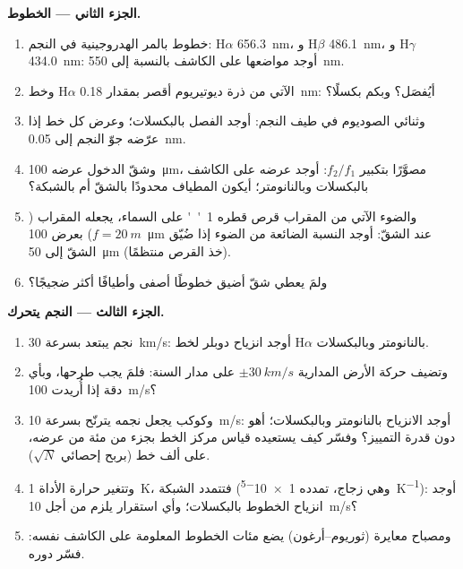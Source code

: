 \begin{problem}
\medskip
\noindent\textbf{الجزء الثاني --- الخطوط.}
\begin{enumerate}[resume]
  \item خطوط بالمر الهدروجينية في النجم: H$\alpha$ \qty{656.3}{nm}،
        و H$\beta$ \qty{486.1}{nm}، و H$\gamma$ \qty{434.0}{nm}: أوجد مواضعها على
        الكاشف بالنسبة إلى \qty{550}{nm}.
  \item وخط H$\alpha$ الآتي من ذرة ديوتيريوم أقصر بمقدار \qty{0.18}{nm}: أيُفصَل؟
        وبكم بكسلًا؟
  \item وثنائي الصوديوم في طيف النجم: أوجد الفصل
        بالبكسلات؛ وعرض كل خط إذا عرّضه جوّ النجم
        إلى \qty{0.05}{nm}.
  \item وشقّ الدخول عرضه \qty{100}{\micro m}، مصوَّرًا بتكبير
        $f_2/f_1$: أوجد عرضه على الكاشف بالبكسلات
        وبالنانومتر؛ أيكون المطياف محدودًا بالشقّ أم بالشبكة؟
  \item والضوء الآتي من المقراب قرص قطره \qty{1}{''} على
        السماء، يجعله المقراب ($f = \qty{20}{m}$) بعرض \qty{100}{\micro m}
        عند الشقّ: أوجد النسبة الضائعة من الضوء إذا ضُيّق الشقّ
        إلى \qty{50}{\micro m} (خذ القرص منتظمًا).
  \item ولمَ يعطي شقّ أضيق خطوطًا أصفى وأطيافًا أكثر
        ضجيجًا؟
\end{enumerate}

\medskip
\noindent\textbf{الجزء الثالث --- النجم يتحرك.}
\begin{enumerate}[resume]
  \item نجم يبتعد بسرعة \qty{30}{km/s}: أوجد انزياح دوبلر لخط H$\alpha$ بالنانومتر
        وبالبكسلات.
  \item وتضيف حركة الأرض المدارية $\pm\qty{30}{km/s}$ على مدار السنة:
        فلمَ يجب طرحها، وبأي دقة إذا أُريدت
        \qty{100}{m/s}؟
  \item وكوكب يجعل نجمه يترنّح بسرعة \qty{10}{m/s}: أوجد الانزياح بالنانومتر
        وبالبكسلات؛ أهو دون قدرة التمييز؟ وفسّر كيف يستعيده قياس
        مركز الخط بجزء من مئة من عرضه، على
        ألف خط (بربح إحصائي $\sqrt{N}$).
  \item وتتغير حرارة الأداة \qty{1}{K}، فتتمدد
        الشبكة (وهي زجاج، تمدده \qty{1e-5}{K^{-1}}): أوجد انزياح
        الخطوط بالبكسلات؛ وأي استقرار يلزم من أجل \qty{10}{m/s}؟
  \item ومصباح معايرة (ثوريوم--أرغون) يضع مئات الخطوط
        المعلومة على الكاشف نفسه: فسّر دوره.
\end{enumerate}


\end{problem}
